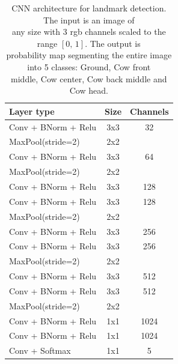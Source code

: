 \documentclass{cta-author}
\begin{document}
\begin{table}
\begin{center}
\begin{tabular}{|l|c|c|}
\hline
\textbf{Layer type} & \textbf{Size} & \textbf{Channels} \\
\hline

Conv + BNorm + Relu & 3x3 & 32 \\
MaxPool(stride=2) & 2x2 &  \\
\hline

Conv + BNorm + Relu & 3x3 & 64 \\
MaxPool(stride=2) & 2x2 &  \\
\hline

Conv + BNorm + Relu & 3x3 & 128 \\
Conv + BNorm + Relu & 3x3 & 128 \\
MaxPool(stride=2) & 2x2 &  \\
\hline

Conv + BNorm + Relu & 3x3 & 256 \\
Conv + BNorm + Relu & 3x3 & 256 \\
MaxPool(stride=2) & 2x2 &  \\
\hline

Conv + BNorm + Relu & 3x3 & 512 \\
Conv + BNorm + Relu & 3x3 & 512 \\
MaxPool(stride=2) & 2x2 &  \\
\hline

Conv + BNorm + Relu & 1x1 & 1024 \\
Conv + BNorm + Relu & 1x1 & 1024 \\
Conv + Softmax & 1x1 & 5 \\
\hline

\end{tabular}
\end{center}
\caption{CNN architecture for landmark detection. 
The input is an image of \\
any size with 3 rgb channels scaled to the range $\left[0,\,1\right]$. The output is \\
probability map segmenting the entire image into 5 classes: Ground, Cow front \\
middle, Cow center, Cow back middle and Cow head.
}
\label{tab:cownet}
\end{table}
\end{document}
